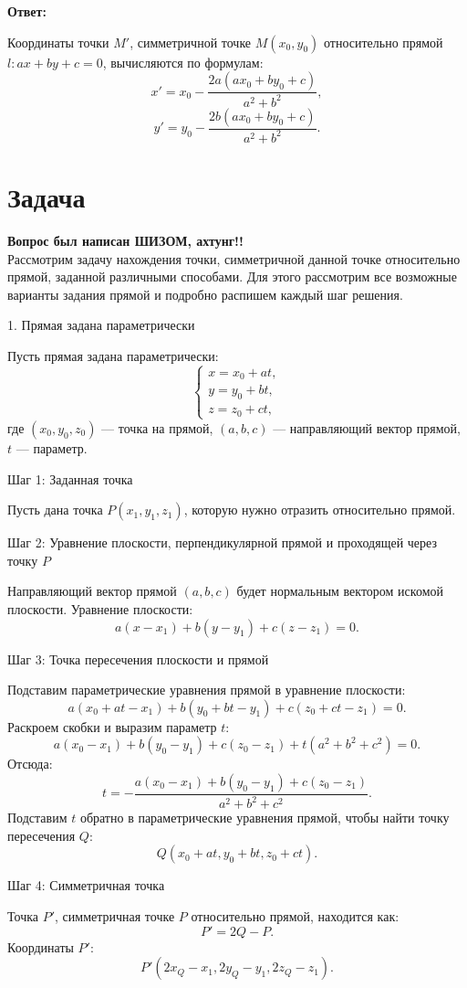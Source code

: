 \documentclass[a4paper,14pt]{extreport} %
\begin{document}
\textbf{Ответ:}

Координаты точки \( M' \), симметричной точке \( M(x_0, y_0) \) относительно прямой \( l: ax + by + c = 0 \), вычисляются по формулам:
\[
x' = x_0 - \frac{2a(a x_0 + b y_0 + c)}{a^2 + b^2},
\]
\[
y' = y_0 - \frac{2b(a x_0 + b y_0 + c)}{a^2 + b^2}.
\]
\section*{Задача}
\textbf{Вопрос был написан ШИЗОМ, ахтунг!!}\\
Рассмотрим задачу нахождения точки, симметричной данной точке относительно прямой, заданной различными способами. Для этого рассмотрим все возможные варианты задания прямой и подробно распишем каждый шаг решения.

    1. Прямая задана параметрически

Пусть прямая задана параметрически:
\[
\begin{cases}
x = x_0 + at, \\
y = y_0 + bt, \\
z = z_0 + ct,
\end{cases}
\]
где \((x_0, y_0, z_0)\) — точка на прямой, \((a, b, c)\) — направляющий вектор прямой, \(t\) — параметр.

     Шаг 1: Заданная точка

Пусть дана точка \(P(x_1, y_1, z_1)\), которую нужно отразить относительно прямой.

     Шаг 2: Уравнение плоскости, перпендикулярной прямой и проходящей через точку \(P\)

Направляющий вектор прямой \((a, b, c)\) будет нормальным вектором искомой плоскости. Уравнение плоскости:
\[
a(x - x_1) + b(y - y_1) + c(z - z_1) = 0.
\]

     Шаг 3: Точка пересечения плоскости и прямой

Подставим параметрические уравнения прямой в уравнение плоскости:
\[
a(x_0 + at - x_1) + b(y_0 + bt - y_1) + c(z_0 + ct - z_1) = 0.
\]
Раскроем скобки и выразим параметр \(t\):
\[
a(x_0 - x_1) + b(y_0 - y_1) + c(z_0 - z_1) + t(a^2 + b^2 + c^2) = 0.
\]
Отсюда:
\[
t = -\frac{a(x_0 - x_1) + b(y_0 - y_1) + c(z_0 - z_1)}{a^2 + b^2 + c^2}.
\]
Подставим \(t\) обратно в параметрические уравнения прямой, чтобы найти точку пересечения \(Q\):
\[
Q\left(x_0 + a t, y_0 + b t, z_0 + c t\right).
\]

     Шаг 4: Симметричная точка

Точка \(P'\), симметричная точке \(P\) относительно прямой, находится как:
\[
P' = 2Q - P.
\]
Координаты \(P'\):
\[
P'\left(2x_Q - x_1, 2y_Q - y_1, 2z_Q - z_1\right).
\]
\end{document}
